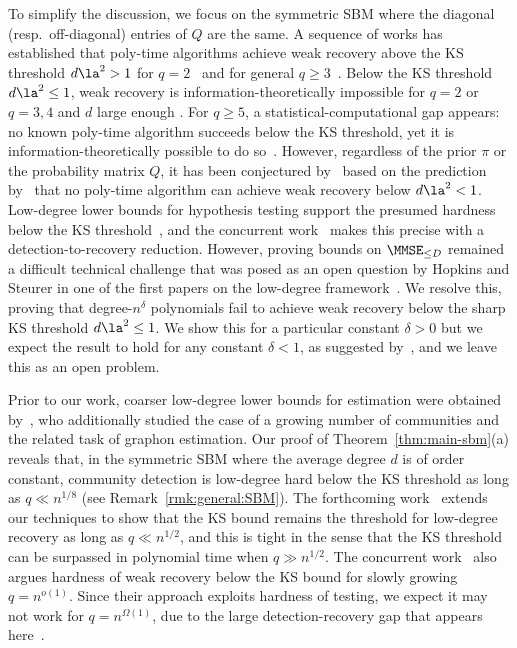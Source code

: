 \documentclass[11pt]{article}
\begin{document}
To simplify the discussion, we focus on the symmetric SBM where the diagonal (resp.\ off-diagonal) entries of $Q$ are the same. A sequence of works has established that poly-time algorithms achieve weak recovery above the KS threshold $d\la^2>1$ for $q=2$~\cite{massoulie,mns-alg,nb-spectrum} and for general $q\geq 3$~\cite{AS-acyclic}. Below the KS threshold $d\la^2\leq 1$, weak recovery is information-theoretically impossible for $q=2$ \cite{mns-impossible} or $q=3,4$ and $d$ large enough \cite{exact-phase-sbm}. For $q \ge 5$, a statistical-computational gap appears: no known poly-time algorithm succeeds below the KS threshold, yet it is information-theoretically possible to do so~\cite{AS-crossing,BMNN, CKPZ:18}. However, regardless of the prior $\pi$ or the probability matrix $Q$, it has been conjectured by~\cite{AS-acyclic} based on the prediction by~\cite{decelle} that no poly-time algorithm can achieve weak recovery below $d\la^2<1$. Low-degree lower bounds for hypothesis testing support the presumed hardness below the KS threshold~\cite{HS-bayesian,spectral-planting}, and the concurrent work~\cite{sbm-reduction} makes this precise with a detection-to-recovery reduction. However, proving bounds on $\MMSE_{\le D}$ remained a difficult technical challenge that was posed as an open question by Hopkins and Steurer in one of the first papers on the low-degree framework~\cite{HS-bayesian}. We resolve this, proving that degree-$n^\delta$ polynomials fail to achieve weak recovery below the sharp KS threshold $d\la^2\leq 1$. We show this for a particular constant $\delta > 0$ but we expect the result to hold for any constant $\delta < 1$, as suggested by~\cite{sbm-reduction}, and we leave this as an open problem.

Prior to our work, coarser low-degree lower bounds for estimation were obtained by~\cite{graphon}, who additionally studied the case of a growing number of communities and the related task of graphon estimation. Our proof of Theorem~\ref{thm:main-sbm}(a) reveals that, in the symmetric SBM where the average degree $d$ is of order constant, community detection is low-degree hard below the KS threshold as long as $q \ll n^{1/8}$ (see Remark~\ref{rmk:general:SBM}). The forthcoming work~\cite{CMSW25} extends our techniques to show that the KS bound remains the threshold for low-degree recovery as long as $q\ll n^{1/2}$, and this is tight in the sense that the KS threshold can be surpassed in polynomial time when $q\gg n^{1/2}$. The concurrent work~\cite{sbm-reduction} also argues hardness of weak recovery below the KS bound for slowly growing $q=n^{o(1)}$. Since their approach exploits hardness of testing, we expect it may not work for $q = n^{\Omega(1)}$, due to the large detection-recovery gap that appears here~\cite{CMSW25}.
\end{document}
